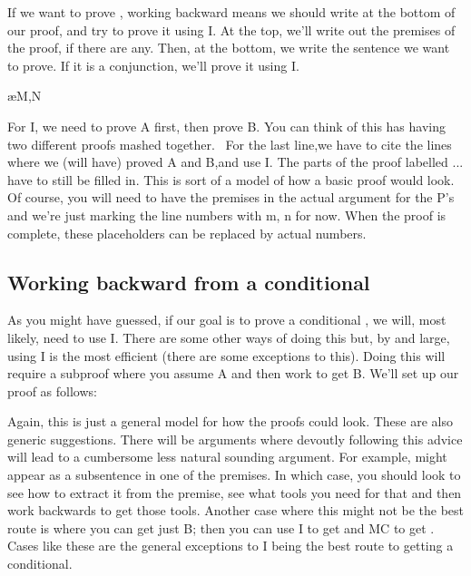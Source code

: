 If we want to prove \eand {}, working backward means we should write \eand {} at the bottom of our proof, and try to prove it using \eand I. At the top, we’ll write out the premises of the proof, if there are any. Then, at the bottom, we write the sentence we want to prove. If it is a conjunction, we’ll prove it using \eand I.
\begin{fitchproof}
\ellipsesline
{}			
\ellipsesline
{}			
\ellipsesline
{}			
\ae{M,N}	
\end{fitchproof}
For \eand I, we need to prove A first, then prove B. You can think of this has having two different proofs mashed together.  For the last line,we have to cite the lines where we (will have) proved A and B,and use \eand I. The parts of the proof labelled ... have to still be filled in. This is sort of a model of how a basic proof would look. Of course, you will need to have the premises in the actual argument for the P's and we're just marking the line numbers with m, n for now. When the proof is complete, these placeholders can be replaced by actual numbers.

\subsection{Working backward from a conditional}

As you might have guessed, if our goal is to prove a conditional \eif{}, we will, most likely, need to use \eif I. There are some other ways of doing this but, by and large, using \eif I is the most efficient (there are some exceptions to this). Doing this will require a subproof where you assume A and then work to get B. We’ll set up our proof as follows:
\begin{fitchproof}
\ellipsesline			
{}			
\open
{}			
\ellipsesline		
{}			
\close
{}	
\end{fitchproof}

Again, this is just a general model for how the proofs could look. These are also generic suggestions. There will be arguments where devoutly following this advice will lead to a cumbersome less natural sounding argument. For example, \eif {} might appear as a subsentence in one of the premises. In which case, you should look to see how to extract it from the premise, see what tools you need for that and then work backwards to get those tools. Another case where this might not be the best route is where you can get just B; then you can use \eor I to get \enot {}\eor {} and MC to get \eif {}. Cases like these are the general exceptions to \eif I being the best route to getting a conditional.

